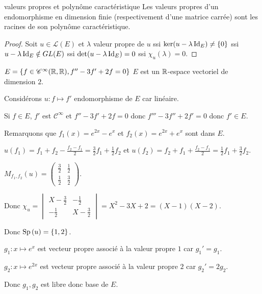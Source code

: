 \begin{theoreme}{valeurs propres et polynôme caractéristique}{}
    Les valeurs propres d'un endomorphisme en dimension finie (respectivement d'une matrice carrée) 
    sont les racines de son polynôme caractéristique.
\end{theoreme}

\begin{proof}
    Soit $u \in \mathscr L(E)$ et $\lambda$ valeur propre de $u$ 
    ssi $\ker(u - \lambda \operatorname{Id}_E) \neq \{0\}$
    ssi $u - \lambda \operatorname{Id}_E \notin GL(E)$
    ssi $\det(u - \lambda \operatorname{Id}_E) = 0$
    ssi $\chi_u(\lambda) = 0$.
\end{proof}

\begin{exemple}
    $E = \{f \in \mathscr C^\infty(\mathbb{R}, \mathbb{R}), f'' - 3 f' + 2f = 0\}$ $E$ est un 
    $\mathbb{R}$-espace vectoriel de dimension $2$.

    Considérons $u : f \mapsto f'$ endomorphisme de $E$ car linéaire. 

    Si $f \in E$, $f'$ est $\mathscr C^\infty$ et $f'' - 3 f' + 2f = 0$ donc $f''' - 3 f'' + 2 f' = 0$ donc $f' \in E$.

    Remarquons que $f_1(x) = e^{2x} - e^x$ et $f_2(x) = e^{2x} + e^x$ sont dans $E$. 

    $u(f_1) = f_1 + f_2 - \frac{f_2 - f_1}{2} = \frac{3}{2} f_1 + \frac{1}{2} f_2$ et
    $u(f_2) = f_2 + f_1 + \frac{f_2 - f_1}{2} = \frac{1}{2} f_1 + \frac{3}{2} f_2$.

    $M_{f_1, f_2}(u) = \begin{pmatrix}
        \frac{3}{2} & \frac{1}{2} \\
        \frac{1}{2} & \frac{3}{2}
    \end{pmatrix}$.

    Donc $\chi_u = \begin{vmatrix}
        X - \frac{3}{2} & -\frac{1}{2} \\
        -\frac{1}{2} & X - \frac{3}{2}
    \end{vmatrix} = X^2 - 3X + 2 = (X - 1)(X - 2)$.

    Donc $\operatorname{Sp} \,(u) = \{1, 2\}$.

    $g_1 : x \mapsto e^x$ est vecteur propre associé à la valeur propre $1$ car $g_1' = g_1$.

    $g_2 : x \mapsto e^{2x}$ est vecteur propre associé à la valeur propre $2$ car $g_2' = 2 g_2$.

    Donc $g_1, g_2$ est libre donc base de $E$.
\end{exemple}

